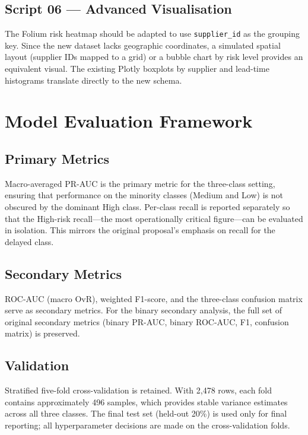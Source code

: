 \documentclass[11pt,a4paper]{article}
\begin{document}
\subsection{Script 06 --- Advanced Visualisation}

The Folium risk heatmap should be adapted to use \texttt{supplier\_id} as the grouping
key. Since the new dataset lacks geographic coordinates, a simulated spatial layout
(supplier IDs mapped to a grid) or a bubble chart by risk level provides an equivalent
visual. The existing Plotly boxplots by supplier and lead-time histograms translate
directly to the new schema.

\section{Model Evaluation Framework}

\subsection{Primary Metrics}

Macro-averaged PR-AUC is the primary metric for the three-class setting, ensuring that
performance on the minority classes (Medium and Low) is not obscured by the dominant
High class. Per-class recall is reported separately so that the High-risk recall---the
most operationally critical figure---can be evaluated in isolation. This mirrors the
original proposal's emphasis on recall for the delayed class.

\subsection{Secondary Metrics}

ROC-AUC (macro OvR), weighted F1-score, and the three-class confusion matrix serve as
secondary metrics. For the binary secondary analysis, the full set of original secondary
metrics (binary PR-AUC, binary ROC-AUC, F1, confusion matrix) is preserved.

\subsection{Validation}

Stratified five-fold cross-validation is retained. With 2,478 rows, each fold contains
approximately 496 samples, which provides stable variance estimates across all three
classes. The final test set (held-out 20\%) is used only for final reporting; all
hyperparameter decisions are made on the cross-validation folds.
\end{document}
